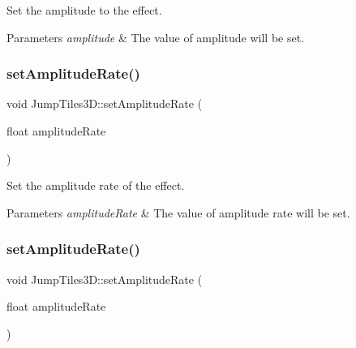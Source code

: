 Set the amplitude to the effect. 


\begin{DoxyParams}{Parameters}
{\em amplitude} & The value of amplitude will be set. \\
\hline
\end{DoxyParams}
\mbox{\label{classJumpTiles3D_a88c71fba09dca459111b8fc0dd03d53f}} 
\subsubsection{\texorpdfstring{set\+Amplitude\+Rate()}{setAmplitudeRate()}\hspace{0.1cm}{\footnotesize\ttfamily [1/2]}}
{\footnotesize\ttfamily void Jump\+Tiles3\+D\+::set\+Amplitude\+Rate (\begin{DoxyParamCaption}\item[{float}]{amplitude\+Rate }\end{DoxyParamCaption})\hspace{0.3cm}{\ttfamily [inline]}}



Set the amplitude rate of the effect. 


\begin{DoxyParams}{Parameters}
{\em amplitude\+Rate} & The value of amplitude rate will be set. \\
\hline
\end{DoxyParams}
\mbox{\label{classJumpTiles3D_a88c71fba09dca459111b8fc0dd03d53f}} 
\subsubsection{\texorpdfstring{set\+Amplitude\+Rate()}{setAmplitudeRate()}\hspace{0.1cm}{\footnotesize\ttfamily [2/2]}}
{\footnotesize\ttfamily void Jump\+Tiles3\+D\+::set\+Amplitude\+Rate (\begin{DoxyParamCaption}\item[{float}]{amplitude\+Rate }\end{DoxyParamCaption})\hspace{0.3cm}{\ttfamily [inline]}}



